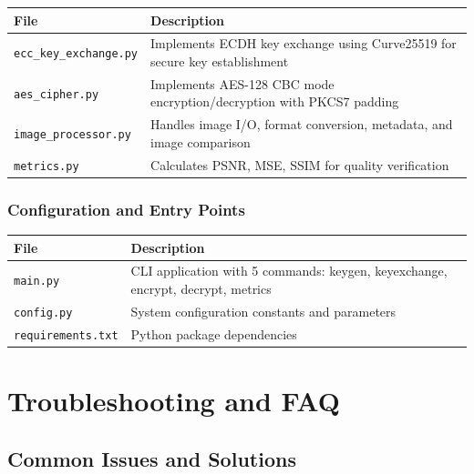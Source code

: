 \documentclass[12pt,a4paper]{report}
\begin{document}
\begin{table}[H]
    \centering
    \begin{tabular}{|l|p{8cm}|}
    \hline
    \textbf{File} & \textbf{Description} \\
    \hline
    \texttt{ecc\_key\_exchange.py} & Implements ECDH key exchange using Curve25519 for secure key establishment \\
    \texttt{aes\_cipher.py} & Implements AES-128 CBC mode encryption/decryption with PKCS7 padding \\
    \texttt{image\_processor.py} & Handles image I/O, format conversion, metadata, and image comparison \\
    \texttt{metrics.py} & Calculates PSNR, MSE, SSIM for quality verification \\
    \hline
    \end{tabular}
\end{table}

\subsection{Configuration and Entry Points}

\begin{table}[H]
    \centering
    \begin{tabular}{|l|p{8cm}|}
    \hline
    \textbf{File} & \textbf{Description} \\
    \hline
    \texttt{main.py} & CLI application with 5 commands: keygen, keyexchange, encrypt, decrypt, metrics \\
    \texttt{config.py} & System configuration constants and parameters \\
    \texttt{requirements.txt} & Python package dependencies \\
    \hline
    \end{tabular}
\end{table}

\chapter{Troubleshooting and FAQ}

\section{Common Issues and Solutions}
\end{document}
